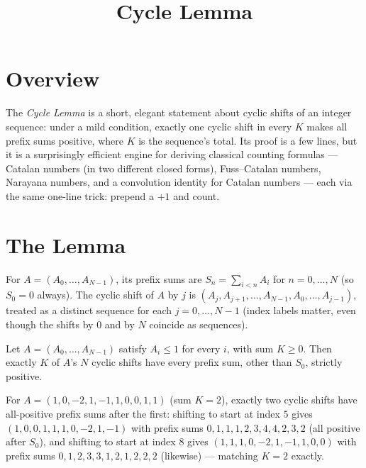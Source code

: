 \documentclass[11pt]{article}
\title{Cycle Lemma}
\author{}
\date{}
\begin{document}
\thispagestyle{fancy}


\section{Overview}
The \emph{Cycle Lemma} is a short, elegant statement about cyclic shifts
of an integer sequence: under a mild condition, exactly one cyclic shift
in every $K$ makes all prefix sums positive, where $K$ is the sequence's
total. Its proof is a few lines, but it is a surprisingly efficient engine
for deriving classical counting formulas --- Catalan numbers (in two
different closed forms), Fuss--Catalan numbers, Narayana numbers, and a
convolution identity for Catalan numbers --- each via the same one-line
trick: prepend a $+1$ and count.

\section{The Lemma}
\begin{definitionbox}
For $A=(A_0,\ldots,A_{N-1})$, its prefix sums are
$S_n = \sum_{i<n} A_i$ for $n=0,\ldots,N$ (so $S_0=0$ always). The cyclic
shift of $A$ by $j$ is $(A_j, A_{j+1}, \ldots, A_{N-1}, A_0, \ldots,
A_{j-1})$, treated as a distinct sequence for each $j=0,\ldots,N-1$ (index
labels matter, even though the shifts by $0$ and by $N$ coincide as
sequences).
\end{definitionbox}

\begin{theorembox}
Let $A=(A_0,\ldots,A_{N-1})$ satisfy $A_i \le 1$ for every $i$, with sum
$K \ge 0$. Then exactly $K$ of $A$'s $N$ cyclic shifts have every prefix
sum, other than $S_0$, strictly positive.
\end{theorembox}

\begin{examplebox}
For $A=(1,0,-2,1,-1,1,0,0,1,1)$ (sum $K=2$), exactly two cyclic shifts
have all-positive prefix sums after the first: shifting to start at index
$5$ gives $(1,0,0,1,1,1,0,-2,1,-1)$ with prefix sums
$0,1,1,1,2,3,4,4,2,3,2$ (all positive after $S_0$), and shifting to start
at index $8$ gives $(1,1,1,0,-2,1,-1,1,0,0)$ with prefix sums
$0,1,2,3,3,1,2,1,2,2,2$ (likewise) --- matching $K=2$ exactly.
\end{examplebox}
\end{document}
